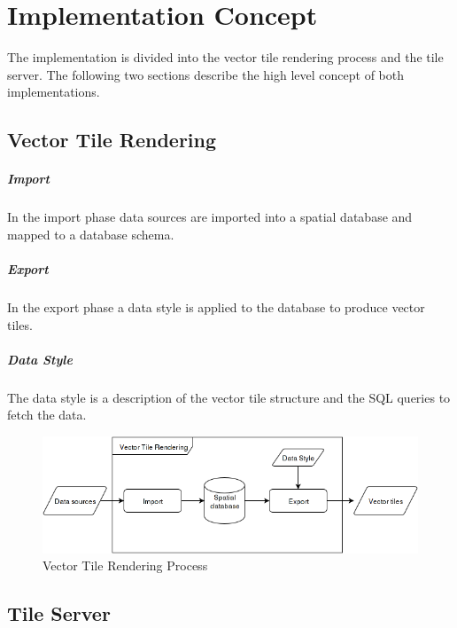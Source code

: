 \chapter{Implementation Concept}\label{implementation_concept}

The implementation is divided into the vector tile rendering process and the tile server. The following two sections describe the high level concept of both implementations.

\section{Vector Tile Rendering}

\paragraph{Import}
In the import phase data sources are imported into a spatial database and mapped to a database schema.

\paragraph{Export}
In the export phase a data style is applied to the database to produce vector tiles.

\paragraph{Data Style}
The data style is a description of the vector tile structure and the SQL queries to fetch the data.

\begin{figure}[H]
  \centering
  \includegraphics[scale=0.6]{images/vector_tile_rendering_squashed.png}
  \caption{Vector Tile Rendering Process}
\end{figure}

\section{Tile Server}

